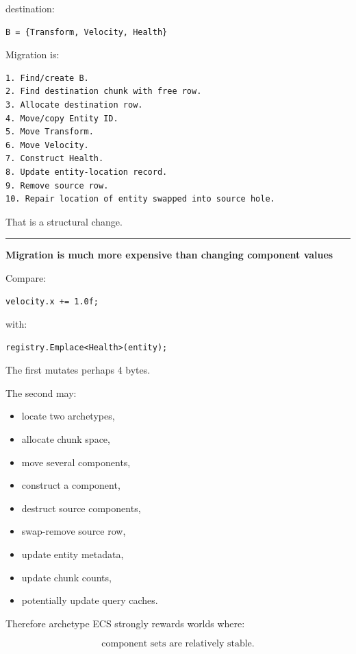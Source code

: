 destination:

\begin{verbatim}
B = {Transform, Velocity, Health}
\end{verbatim}

Migration is:

\begin{verbatim}
1. Find/create B.
2. Find destination chunk with free row.
3. Allocate destination row.
4. Move/copy Entity ID.
5. Move Transform.
6. Move Velocity.
7. Construct Health.
8. Update entity-location record.
9. Remove source row.
10. Repair location of entity swapped into source hole.
\end{verbatim}

That is a structural change.

\begin{center}\rule{0.5\linewidth}{0.5pt}\end{center}

\textbf{Migration is much more expensive than changing component values}

Compare:

\begin{verbatim}
velocity.x += 1.0f;
\end{verbatim}

with:

\begin{verbatim}
registry.Emplace<Health>(entity);
\end{verbatim}

The first mutates perhaps 4 bytes.

The second may:

\begin{itemize}
\tightlist
\item
  locate two archetypes,
\item
  allocate chunk space,
\item
  move several components,
\item
  construct a component,
\item
  destruct source components,
\item
  swap-remove source row,
\item
  update entity metadata,
\item
  update chunk counts,
\item
  potentially update query caches.
\end{itemize}

Therefore archetype ECS strongly rewards worlds where:

\[
\boxed{
\text{component sets are relatively stable}.
}
\]

